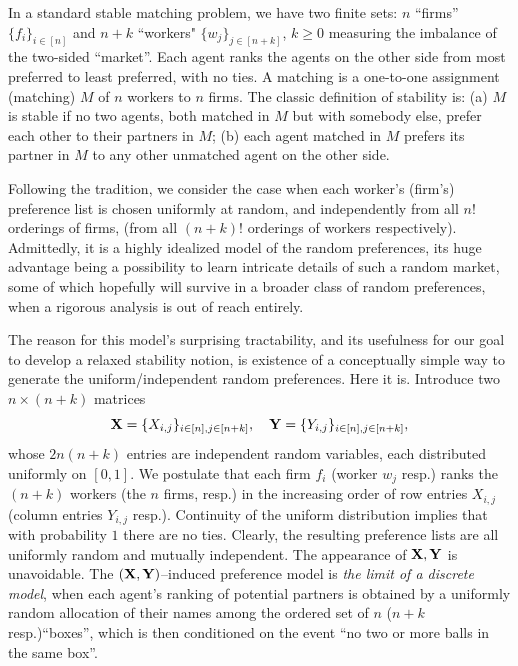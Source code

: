 \documentclass[11pt]{amsart}
\theoremstyle{remark}
\numberwithin{equation}{section}
\begin{document}
In a standard stable matching problem, we have two finite sets: 
$n$ ``firms'' $\{f_i\}_{i\in [n]}$ and $n+k$ ``workers" $\{w_j\}_{j\in [n+k]}$, $k\ge 0$ measuring the imbalance of the two-sided
``market''. Each agent ranks the agents on the other side from most preferred to least preferred, with no ties. A matching is a one-to-one assignment (matching) $M$ of $n$ workers to $n$ firms. The classic definition of stability is: (a) $M$ is stable
if no two agents, both matched in $M$ but with somebody else, prefer each other to their partners in $M$; (b) each agent matched in $M$ prefers its partner in $M$ to any other unmatched agent on the other side.

Following the tradition, we consider the case when each worker's (firm's)  preference list is chosen uniformly at random, and independently from all $n!$ orderings of firms, (from all $(n+k)!$ orderings of workers respectively). Admittedly, it is a highly idealized model of the random preferences, its huge advantage being a possibility to learn intricate details of such a random market, some of which hopefully will survive in a broader class of random preferences, when a rigorous analysis is
out of reach entirely. 

The reason for this model's surprising tractability, and its usefulness for our goal to develop a relaxed stability notion, is existence of a conceptually simple way to generate the uniform/independent random preferences. Here it is. Introduce two
$n\times (n+k)$ matrices 
\[
\bold X=\{X_{i,j}\}_{i\in [n],j\in [n+k]},\quad \bold Y=\{Y_{i,j}\}_{i\in [n],j\in [n+k]},
\]
whose $2n(n+k)$ entries are independent random variables, each distributed uniformly on $[0,1]$. We postulate that each 
firm $f_i$ (worker $w_j$ resp.) ranks the $(n+k)$ workers (the $n$ firms, resp.) in the increasing order of row entries $X_{i,j}$(column entries $Y_{i,j}$ resp.). Continuity of the uniform distribution implies that with probability $1$ there are no ties. Clearly, the resulting preference lists are all uniformly random and mutually independent. The appearance of $\bold X,\bold Y$ is unavoidable.
The $(\bold X ,\bold Y)$--induced preference model is {\it the limit of a discrete model\/}, when each agent's ranking of potential partners is obtained by a uniformly random allocation of their names among the ordered set of $n$ ($n+k$ resp.)``boxes'', which is then conditioned on the event ``no two or more balls in the same box''.
\end{document}
